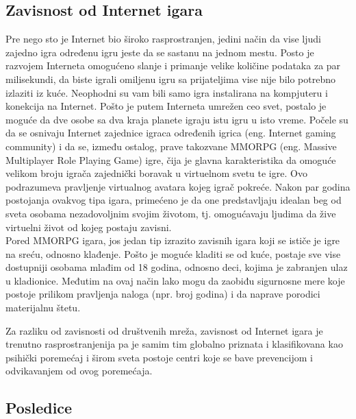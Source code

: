 \documentclass[a4paper]{article}
\begin{document}
\subsection{Zavisnost od Internet igara}	
\label{subsec:podnaslovIP6}

\indent Pre nego sto je Internet bio široko rasprostranjen, jedini način da vise ljudi zajedno igra određenu igru jeste da se sastanu na jednom mestu. Posto je razvojem Interneta omogućeno slanje i primanje velike količine podataka za par milisekundi, da biste igrali omiljenu igru sa prijateljima vise nije bilo potrebno izlaziti iz kuće. Neophodni su vam bili samo igra instalirana na kompjuteru i konekcija na Internet. Pošto je putem Interneta umrežen ceo svet, postalo je moguće da dve osobe sa dva kraja planete igraju istu igru u isto vreme. Počele su da se osnivaju Internet zajednice igraca određenih igrica (eng. Internet gaming community) i da se, između ostalog, prave takozvane MMORPG (eng. Massive Multiplayer Role Playing Game) igre, čija je glavna karakteristika da omoguće velikom broju igrača zajednički boravak u virtuelnom svetu te igre. Ovo podrazumeva pravljenje virtualnog avatara kojeg igrač pokreće. Nakon par godina postojanja ovakvog tipa igara, primećeno je da one predstavljaju idealan beg od sveta osobama nezadovoljnim svojim životom, tj. omogućavaju ljudima da žive virtuelni život od kojeg postaju zavisni. 
\\
\indent Pored MMORPG igara, jos jedan tip izrazito zavisnih igara koji se ističe je igre na sreću, odnosno klađenje. Pošto je moguće kladiti se od kuće, postaje sve vise dostupniji osobama mlađim od 18 godina, odnosno deci, kojima je zabranjen ulaz u kladionice. Međutim na ovaj način lako mogu da zaobiđu sigurnosne mere koje postoje prilikom pravljenja naloga (npr. broj godina) i da naprave porodici materijalnu štetu.

Za razliku od zavisnosti od društvenih mreža, zavisnost od Internet igara je trenutno rasprostranjenija pa je samim tim globalno priznata i klasifikovana kao psihički poremećaj i širom sveta postoje centri koje se bave prevencijom i odvikavanjem od ovog poremećaja.

\subsection{Posledice}
\label{subsec:podnaslovZI2}
\end{document}
